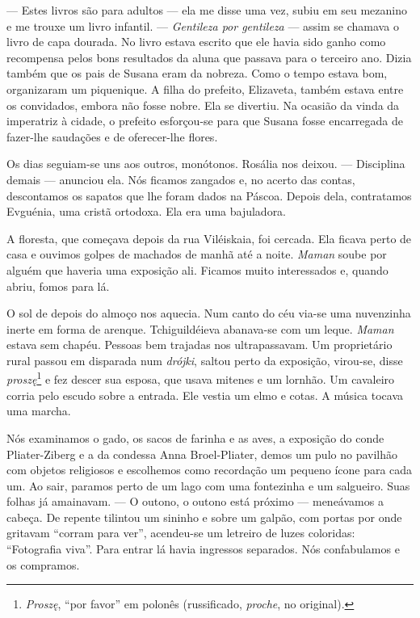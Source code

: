 --- Estes livros são para adultos --- ela me disse uma vez, subiu em seu
mezanino e me trouxe um livro infantil. --- \emph{Gentileza por
gentileza} --- assim se chamava o livro de capa dourada. No livro estava
escrito que ele havia sido ganho como recompensa pelos bons resultados
da aluna que passava para o terceiro ano. Dizia também que os pais de
Susana eram da nobreza. Como o tempo estava bom, organizaram um
piquenique. A filha do prefeito, Elizaveta, também estava entre os
convidados, embora não fosse nobre. Ela se divertiu. Na ocasião da vinda
da imperatriz à cidade, o prefeito esforçou-se para que Susana fosse
encarregada de fazer-lhe saudações e de oferecer-lhe flores.

Os dias seguiam-se uns aos outros, monótonos. Rosália nos deixou. ---
Disciplina demais --- anunciou ela. Nós ficamos zangados e, no acerto
das contas, descontamos os sapatos que lhe foram dados na Páscoa. Depois
dela, contratamos Evguénia, uma cristã ortodoxa. Ela era uma bajuladora.

A floresta, que começava depois da rua Viléiskaia, foi cercada. Ela
ficava perto de casa e ouvimos golpes de machados de manhã até a noite.
\emph{Maman} soube por alguém que haveria uma exposição ali. Ficamos
muito interessados e, quando abriu, fomos para lá.

O sol de depois do almoço nos aquecia. Num canto do céu via-se uma
nuvenzinha inerte em forma de arenque. Tchiguildéieva abanava-se com um
leque. \emph{Maman} estava sem chapéu. Pessoas bem trajadas nos
ultrapassavam. Um proprietário rural passou em disparada num
\emph{drójki}, saltou perto da exposição, virou-se, disse
\emph{proszę}\footnote{\emph{Proszę}, ``por favor'' em polonês
  (russificado, \emph{proche}, no original).} e fez descer sua esposa,
que usava mitenes e um lornhão. Um cavaleiro corria pelo escudo sobre a
entrada. Ele vestia um elmo e cotas. A música tocava uma marcha.

Nós examinamos o gado, os sacos de farinha e as aves, a exposição do
conde Pliater-Ziberg e a da condessa Anna Broel-Pliater, demos um pulo
no pavilhão com objetos religiosos e escolhemos como recordação um
pequeno ícone para cada um. Ao sair, paramos perto de um lago com uma
fontezinha e um salgueiro. Suas folhas já amainavam. --- O outono, o
outono está próximo --- meneávamos a cabeça. De repente tilintou um
sininho e sobre um galpão, com portas por onde gritavam ``corram para
ver'', acendeu-se um letreiro de luzes coloridas: ``Fotografia viva''.
Para entrar lá havia ingressos separados. Nós confabulamos e os
compramos.

